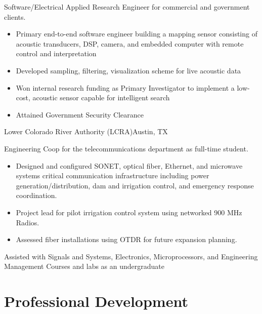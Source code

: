\documentclass[11pt,a4paper,sans]{moderncv}
\begin{document}
{}{
Software/Electrical Applied Research Engineer for commercial and government clients.  
     \begin{itemize}
        \item Primary end-to-end software engineer building a mapping sensor consisting of acoustic transducers, DSP, camera, and embedded computer with remote control and interpretation 
        \item Developed sampling, filtering, visualization scheme for live acoustic data 
        \item Won internal research funding as Primary Investigator to 
            implement a low-cost, acoustic sensor capable for intelligent search 
        \item Attained Government Security Clearance
    \end{itemize}
         }
            {Lower Colorado River Authority (LCRA)}{Austin, TX}{}
            {Engineering Coop for the telecommunications department 
            as full-time student.
 \begin{itemize}
        \item Designed and configured SONET, optical fiber, Ethernet, and microwave systems
            critical communication infrastructure including power generation/distribution, dam and 
            irrigation control, and emergency response coordination. 
        \item Project lead for pilot irrigation control system using networked
            900 MHz Radios. 
        \item Assessed fiber installations using OTDR for future expansion planning.
    \end{itemize}
}

{Assisted with Signals and Systems, Electronics, Microprocessors, and 
Engineering Management Courses and labs as an undergraduate}


\section{Professional Development}
\end{document}
